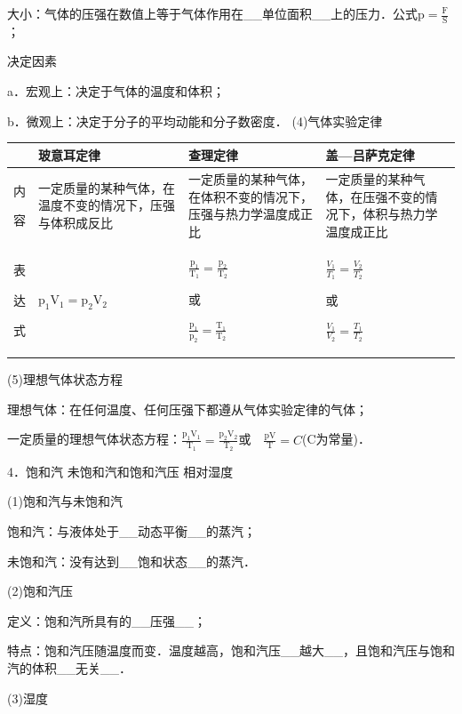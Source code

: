大小：气体的压强在数值上等于气体作用在\_\_单位面积\_\_上的压力．公式$\mathrm{p}=\frac{\mathrm{F}}{\mathrm{S}}$；

决定因素

a．宏观上：决定于气体的温度和体积；

b．微观上：决定于分子的平均动能和分子数密度．
\newpage
(4)气体实验定律

\begin{longtable}[]{@{}m{0.5cm}m{4cm}m{4cm}m{4cm}@{}}
\toprule
& 玻意耳定律 & 查理定律 & 盖---吕萨克定律\tabularnewline
\midrule
\endhead
内

容& 
一定质量的某种气体，在温度不变的情况下，压强与体积成反比
&
一定质量的某种气体，在体积不变的情况下，压强与热力学温度成正比
&
一定质量的某种气体，在压强不变的情况下，体积与热力学温度成正比
\tabularnewline
表

达

式&$\mathrm{p}_{1} \mathrm{V}_{1}=\mathrm{p}_{2} \mathrm{V}_{2}$&$\frac{\mathrm{p}_{1}}{\mathrm{T}_{1}}=\frac{\mathrm{p}_{2}}{\mathrm{T}_{2}}$

或

$\frac{\mathrm{p}_{1}}{\mathrm{p}_{2}}=\frac{\mathrm{T}_{1}}{\mathrm{T}_{2}}$
&$\frac{V_{1}}{T_{1}}=\frac{V_{2}}{T_{2}}$

或

$\frac{V_{1}}{V_{2}}=\frac{T_{1}}{T_{2}}$\tabularnewline
\bottomrule
\end{longtable}

(5)理想气体状态方程

理想气体：在任何温度、任何压强下都遵从气体实验定律的气体；

一定质量的理想气体状态方程：$\frac{\mathrm{p}_{1} \mathrm{V}_{1}}{\mathrm{T}_{1}}=\frac{\mathrm{p}_{2} \mathrm{V}_{2}}{\mathrm{T}_{2}}$或　$\frac{\mathrm{p} \mathrm{V}}{\mathrm{T}}=C$(C为常量)．

4．饱和汽 未饱和汽和饱和汽压 相对湿度

(1)饱和汽与未饱和汽

饱和汽：与液体处于\_\_动态平衡\_\_的蒸汽；

未饱和汽：没有达到\_\_饱和状态\_\_的蒸汽．

(2)饱和汽压

定义：饱和汽所具有的\_\_压强\_\_；

特点：饱和汽压随温度而变．温度越高，饱和汽压\_\_越大\_\_，且饱和汽压与饱和汽的体积\_\_无关\_\_．

(3)湿度

